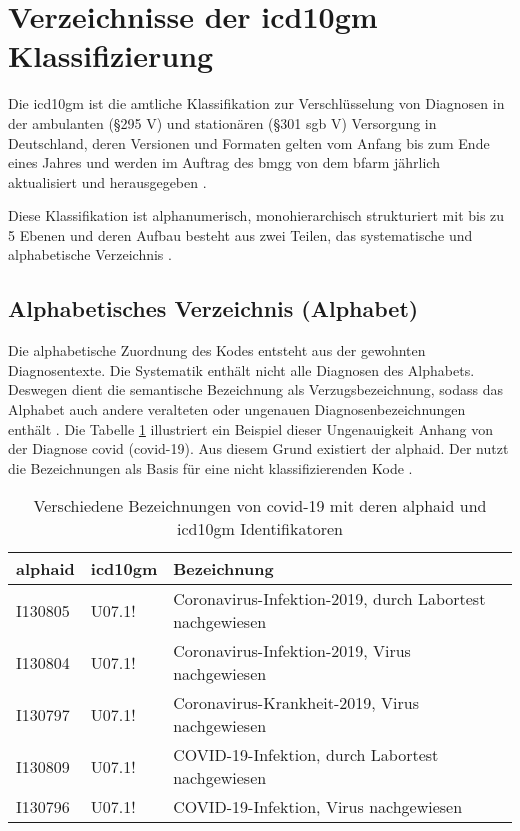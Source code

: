 \section{Verzeichnisse der \acs{icd10gm} Klassifizierung}

Die \ac{icd10gm} ist die amtliche Klassifikation zur Verschlüsselung von Diagnosen in der ambulanten (\S 295  V) und stationären (\S 301 \ac{sgb} V) Versorgung in Deutschland, deren Versionen und Formaten gelten vom Anfang bis zum Ende eines Jahres und werden im Auftrag des \ac{bmgg} von dem \ac{bfarm} jährlich aktualisiert und herausgegeben \cite{icd10}. 

Diese Klassifikation ist alphanumerisch, monohierarchisch strukturiert mit bis zu 5 Ebenen und deren Aufbau besteht aus zwei Teilen, das systematische und alphabetische Verzeichnis \cite{icd10}.

\subsection{Alphabetisches Verzeichnis (Alphabet)} \label{alphadir}

Die alphabetische Zuordnung des Kodes entsteht aus der gewohnten Diagnosentexte. Die Systematik enthält nicht alle Diagnosen des Alphabets. Deswegen dient die semantische Bezeichnung als Verzugsbezeichnung, sodass das Alphabet auch andere veralteten oder ungenauen Diagnosenbezeichnungen enthält \cite{icd10alpha}. Die Tabelle \ref{tab:difbe} illustriert ein Beispiel dieser Ungenauigkeit Anhang von der Diagnose \acl{covid} (\acs{covid}-19). Aus diesem Grund existiert der \ac{alphaid}. Der nutzt die Bezeichnungen als Basis für eine nicht klassifizierenden Kode \cite{icd10alpha}.

\begin{table}[ht]
	\centering
	\small
	\caption[Verschiedene Bezeichnungen von COVID-19]{Verschiedene Bezeichnungen von \ac{covid}-19 mit deren \ac{alphaid} und \ac{icd10gm} Identifikatoren}
	\label{tab:difbe}
	\begin{tabular}{|l|l|l|}
		\hline
		\rowcolor{lightgray} \ac{alphaid} & \ac{icd10gm} & Bezeichnung \\
		\hline
		I130805 & U07.1! & Coronavirus-Infektion-2019, durch Labortest nachgewiesen \\ \hline
		I130804 & U07.1! & Coronavirus-Infektion-2019, Virus nachgewiesen \\ \hline
		I130797 & U07.1! & Coronavirus-Krankheit-2019, Virus nachgewiesen \\ \hline
		I130809 & U07.1! & COVID-19-Infektion, durch Labortest nachgewiesen \\ \hline
		I130796 & U07.1! & COVID-19-Infektion, Virus nachgewiesen \\ \hline				
	\end{tabular}
\end{table}


